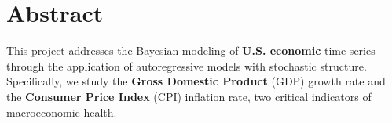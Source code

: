 \documentclass{Configuration_Files/PoliMi3i_thesis}
\begin{document}


\pagestyle{empty} %
\frontmatter %



\pagestyle{empty}
\frontmatter            
\tableofcontents        

\startpreamble
\setcounter{page}{1} %

\chapter*{Abstract} 
This project addresses the Bayesian modeling of \textbf{U.S. economic} time series through the application of autoregressive models with stochastic structure. Specifically, we study the \textbf{Gross Domestic Product} (GDP) growth rate and the \textbf{Consumer Price Index} (CPI) inflation rate, two critical indicators of macroeconomic health.
\end{document}
